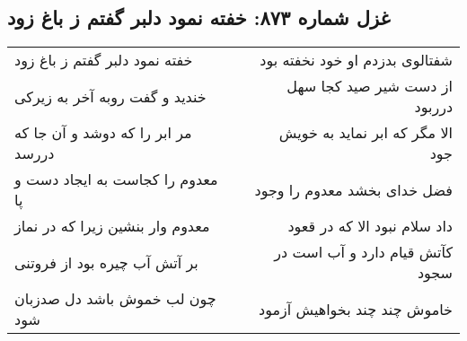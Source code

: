 \begin{center}
\section*{غزل شماره ۸۷۳: خفته نمود دلبر گفتم ز باغ زود}
\label{sec:0873}
\begin{longtable}{l p{0.5cm} r}
خفته نمود دلبر گفتم ز باغ زود
&&
شفتالوی بدزدم او خود نخفته بود
\\
خندید و گفت روبه آخر به زیرکی
&&
از دست شیر صید کجا سهل درربود
\\
مر ابر را که دوشد و آن جا که دررسد
&&
الا مگر که ابر نماید به خویش جود
\\
معدوم را کجاست به ایجاد دست و پا
&&
فضل خدای بخشد معدوم را وجود
\\
معدوم وار بنشین زیرا که در نماز
&&
داد سلام نبود الا که در قعود
\\
بر آتش آب چیره بود از فروتنی
&&
کآتش قیام دارد و آب است در سجود
\\
چون لب خموش باشد دل صدزبان شود
&&
خاموش چند چند بخواهیش آزمود
\\
\end{longtable}
\end{center}
